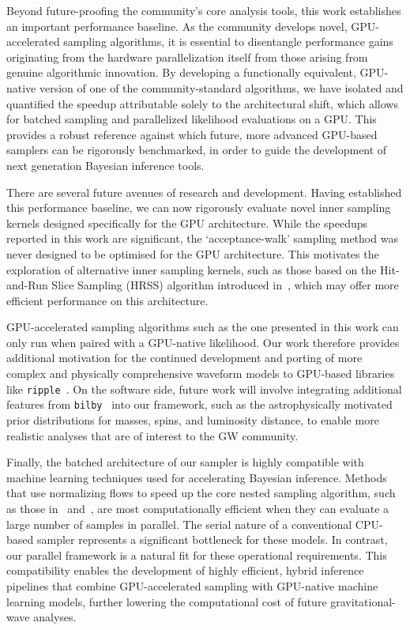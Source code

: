 \documentclass[fleqn,usenatbib]{mnras}
\begin{document}
Beyond future-proofing the community's core analysis
tools, this work establishes an important performance baseline. 
As the community develops novel, GPU-accelerated
sampling algorithms, it is essential to disentangle performance gains
originating from the hardware parallelization itself from those arising
from genuine algorithmic innovation. By developing a functionally
equivalent, GPU-native version of one of the community-standard 
algorithms, we have isolated and quantified the speedup attributable
solely to the architectural shift, which allows for batched sampling and
parallelized likelihood evaluations on a GPU.
This provides a robust reference against which future, more advanced
GPU-based samplers can be rigorously benchmarked, in order to 
guide the development of next generation Bayesian inference tools.

There are several future avenues of research and development. 
Having established this performance baseline, we can now rigorously
evaluate novel inner sampling kernels designed specifically for the GPU
architecture. While the speedups reported in this work are significant,
the `acceptance-walk' sampling method was never designed to be 
optimised for the GPU architecture. This motivates the exploration of 
alternative inner sampling kernels, such as those based on the 
Hit-and-Run Slice Sampling (HRSS) algorithm introduced in~\cite{yallup2025nested}, 
which may offer more efficient performance on this architecture.

GPU-accelerated sampling algorithms such as the one presented in this work can only run when
paired with a GPU-native likelihood. Our work therefore provides additional 
motivation for the continued development
and porting of more complex and physically comprehensive waveform models
to GPU-based libraries like \texttt{ripple}~\citep{ripple}. On the software side, future
work will involve integrating additional features from \texttt{bilby}~\citep{bilby_paper}
into our framework, such as the astrophysically motivated prior
distributions for masses, spins, and luminosity distance, to enable 
more realistic analyses that are of interest to the GW community.

Finally, the batched architecture of our sampler is highly compatible
with machine learning techniques used for accelerating Bayesian
inference. Methods that use normalizing flows to speed up
the core nested sampling algorithm, such as those in~\cite{Williams2021Nessai}
and~\cite{Prathaban}, are most
computationally efficient when they can evaluate a large number of
samples in parallel. The serial nature of a conventional CPU-based
sampler represents a significant bottleneck for these models. In
contrast, our parallel framework is a natural fit for these operational 
requirements. This compatibility enables the development of highly efficient,
hybrid inference pipelines that combine GPU-accelerated sampling with
GPU-native machine learning models, further lowering the computational
cost of future gravitational-wave analyses.
\end{document}
